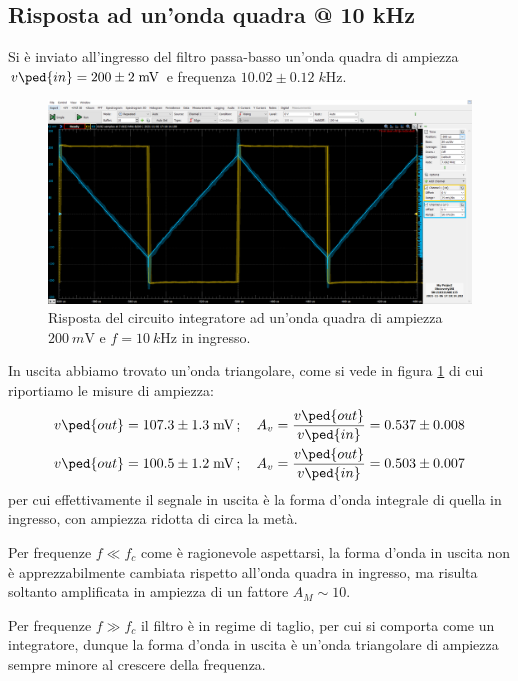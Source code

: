 \documentclass[10pt, a4paper, italian]{article}
\begin{document}
\subsection{Risposta ad un'onda quadra @ 10 kHz}
Si è inviato all'ingresso del filtro passa-basso un'onda quadra di
ampiezza $v\ped{in} = 200 \pm 2 \; \si{m\V}$ e frequenza
$10.02 \pm 0.12 \; \si{k\Hz}$.

\begin{figure}[htbp]
\centering
\includegraphics[scale=0.42]{integratore}
\caption{Risposta del circuito integratore ad un'onda quadra di ampiezza
$\SI{200}{m\V}$ e $f = \SI{10}{k\Hz}$ in ingresso. \label{fig: intsqw}}
\end{figure}

In uscita abbiamo trovato un'onda triangolare, come si vede in figura
\ref{fig: intsqw} di cui riportiamo le misure di ampiezza:
\begin{align*}
v\ped{out} = 107.3 \pm 1.3 \; \si{m\V} \, ; \quad
A_v = \frac{v\ped{out}}{v\ped{in}} = 0.537 \pm 0.008 \\
v\ped{out} = 100.5 \pm 1.2 \; \si{m\V} \, ; \quad
A_v = \frac{v\ped{out}}{v\ped{in}} = 0.503 \pm 0.007
\end{align*}
per cui effettivamente il segnale in uscita è la forma d'onda integrale
di quella in ingresso, con ampiezza ridotta di circa la metà.

Per frequenze $f \ll f_c$ come è ragionevole aspettarsi, la forma d'onda in
uscita non è apprezzabilmente cambiata rispetto all'onda quadra in ingresso,
ma risulta soltanto amplificata in ampiezza di un fattore $A_M \sim 10$.

Per frequenze $f \gg f_c$ il filtro è in regime di taglio, per cui si comporta
come un integratore, dunque la forma d'onda in uscita è un'onda triangolare di
ampiezza sempre minore al crescere della frequenza.
\end{document}
